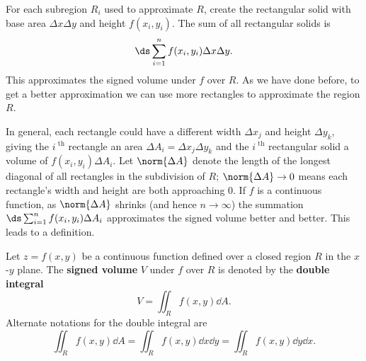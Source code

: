 For each subregion $R_i$ used to approximate $R$, create the rectangular solid with base area $\Delta x\Delta y$ and height $f(x_i,y_i)$. The sum of all rectangular solids is
\[\ds \sum_{i=1}^n f(x_i,y_i)\Delta x\Delta y.\]
This approximates the signed volume under $f$ over $R$. As we have done before, to get a better approximation we can use more rectangles to approximate the region $R$.

In general, each rectangle could have a different width $\Delta x_j$ and height $\Delta y_k$, giving the $i^\text{ th}$ rectangle an area $\Delta A_i = \Delta x_j\Delta y_k$ and the $i^\text{ th}$ rectangular solid a volume of $f(x_i,y_i)\Delta A_i$. Let $\norm{\Delta A}$ denote the length of the longest diagonal of all rectangles in the subdivision of $R$; $\norm{\Delta A}\to 0$ means each rectangle's width and height are both approaching 0. If $f$ is a continuous function, as $\norm{\Delta A}$ shrinks (and hence $n\to\infty$) the summation $\ds \sum_{i=1}^n f(x_i,y_i)\Delta A_i$ approximates the signed volume better and better. This leads to a definition.


\begin{definition}\label{def:double_int}
Let $z=f(x,y)$ be a continuous function defined over a closed region $R$ in the $x$-$y$ plane. The \textbf{signed volume} $V$ under $f$ over $R$ is denoted by the \textbf{double integral}\vspace{-.5\baselineskip}
\[V = \iint_R f(x,y)\dd A.\]
Alternate notations for the double integral are
\[\iint_R f(x,y)\dd A=\iint_R f(x,y)\dd x\dd y=\iint_R f(x,y)\dd y\dd x.\]
\end{definition}

